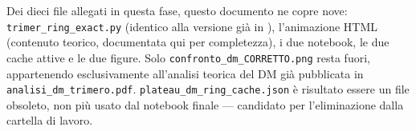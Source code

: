 \documentclass[11pt,a4paper]{article}
\begin{document}
Dei dieci file allegati in questa fase, questo documento ne copre nove:
\texttt{trimer\_ring\_exact.py} (identico alla versione già in
\texttt{}), l'animazione HTML (contenuto
teorico, documentata qui per completezza), i due notebook, le due cache attive e le
due figure. Solo \texttt{confronto\_dm\_CORRETTO.png} resta fuori, appartenendo
esclusivamente all'analisi teorica del DM già pubblicata in
\texttt{analisi\_dm\_trimero.pdf}. \texttt{plateau\_dm\_ring\_cache.json} è
risultato essere un file obsoleto, non più usato dal notebook finale — candidato
per l'eliminazione dalla cartella di lavoro.
\end{document}
